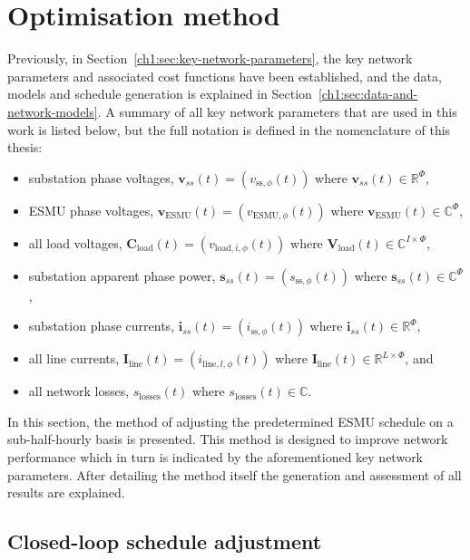 \section{Optimisation method}
\label{ch1:sec:closed-loop-optimisation-method}

Previously, in Section~\ref{ch1:sec:key-network-parameters}, the key network parameters and associated cost functions have been established, and the data, models and schedule generation is explained in Section~\ref{ch1:sec:data-and-network-models}.
A summary of all key network parameters that are used in this work is listed below, but the full notation is defined in the nomenclature of this thesis:

\begin{itemize}
	\item substation phase voltages, $\textbf{v}_{ss}(t) = (v_{\text{ss},\phi}(t))$ where $\textbf{v}_{ss}(t) \in \mathbb{R}^\Phi$,
	\item ESMU phase voltages, $\textbf{v}_\text{ESMU}(t) = (v_{\text{ESMU},\phi}(t))$ where $\textbf{v}_\text{ESMU}(t) \in \mathbb{C}^\Phi$,
	\item all load voltages, $\textbf{C}_\text{load}(t) = (v_{\text{load},i,\phi}(t))$ where $\textbf{V}_\text{load}(t) \in \mathbb{C}^{I\times\Phi}$,
	\item substation apparent phase power, $\textbf{s}_{ss}(t) = (s_{\text{ss},\phi}(t))$ where $\textbf{s}_{ss}(t) \in \mathbb{C}^\Phi$,
	\item substation phase currents, $\textbf{i}_{ss}(t) = (i_{\text{ss},\phi}(t))$ where $\textbf{i}_{ss}(t) \in \mathbb{R}^\Phi$,
	\item all line currents, $\textbf{I}_\text{line}(t) = (i_{\text{line},l,\phi}(t))$ where $\textbf{I}_\text{line}(t) \in \mathbb{R}^{L\times\Phi}$, and
	\item all network losses, $s_\text{losses}(t)$ where $s_\text{losses}(t) \in \mathbb{C}$.
\end{itemize}

In this section, the method of adjusting the predetermined ESMU schedule on a sub-half-hourly basis is presented.
This method is designed to improve network performance which in turn is indicated by the aforementioned key network parameters.
After detailing the method itself the generation and assessment of all results are explained. 

\subsection{Closed-loop schedule adjustment}

